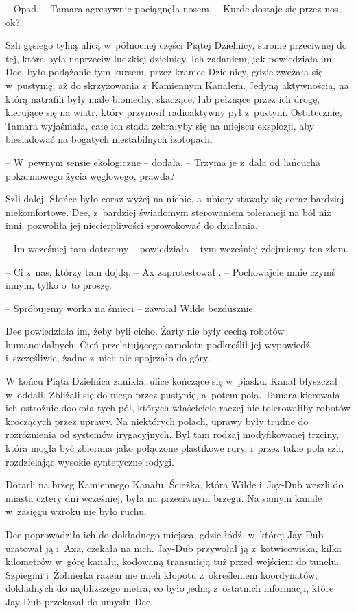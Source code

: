 \documentclass[oneside,polish,11pt,sfheadings]{mwbk}
\begin{document}
-- Opad. -- Tamara agresywnie pociągnęła nosem. -- Kurde dostaje się przez
nos, ok?

Szli gęsiego tylną ulicą w~północnej części Piątej Dzielnicy, stronie
przeciwnej do tej, która była naprzeciw ludzkiej dzielnicy. Ich
zadaniem, jak powiedziała im Dee, było podążanie tym kursem, przez
kraniec Dzielnicy, gdzie zwężała się w~pustynię, aż do skrzyżowania z~Kamiennym Kanałem. Jedyną aktywnością, na którą natrafili były małe
biomechy, skaczące, lub pełznące przez ich drogę, kierujące się na
wiatr, który przynosił radioaktywny pył z~pustyni. Ostatecznie, Tamara
wyjaśniała, całe ich stada zebrałyby się na miejscu eksplozji, aby
biesiadować na bogatych niestabilnych izotopach.

-- W~pewnym sensie ekologiczne -- dodała. -- Trzyma je z~dala od łańcucha
pokarmowego życia węglowego, prawda?

Szli dalej. Słońce było coraz wyżej na niebie, a~ubiory stawały się
coraz bardziej niekomfortowe. Dee, z~bardziej świadomym sterowaniem
tolerancji na ból niż inni, pozwoliła jej niecierpliwości sprowokować do
działania.

-- Im wcześniej tam dotrzemy -- powiedziała -- tym wcześniej zdejmiemy ten
złom.

-- Ci z~nas, którzy tam dojdą. -- Ax zaprotestował . -- Pochowajcie mnie
czymś innym, tylko o~to proszę.

-- Spróbujemy worka na śmieci -- zawołał Wilde bezdusznie.

Dee powiedziała im, żeby byli cicho. Żarty nie były cechą robotów
humanoidalnych. Cień przelatującego samolotu podkreślił jej wypowiedź i~szczęśliwie, żadne z~nich nie spojrzało do góry.

W końcu Piąta Dzielnica zanikła, ulice kończące się w~piasku. Kanał
błyszczał w~oddali. Zbliżali się do niego przez pustynię, a~potem pola.
Tamara kierowała ich ostrożnie dookoła tych pól, których właściciele
raczej nie tolerowaliby robotów kroczących przez uprawy. Na niektórych
polach, uprawy były trudne do rozróżnienia od systemów irygacyjnych. Był
tam rodzaj modyfikowanej trzciny, która mogła być zbierana jako
połączone plastikowe rury, i~przez takie pola szli, rozdzielając wysokie
syntetyczne łodygi.

Dotarli na brzeg Kamiennego Kanału. Ścieżka, którą Wilde i~Jay-Dub
weszli do miasta cztery dni wcześniej, była na przeciwnym brzegu. Na
samym kanale w~zasięgu wzroku nie było ruchu.

Dee poprowadziła ich do dokładnego miejsca, gdzie łódź, w~której Jay-Dub
uratował ją i~Axa, czekała na nich. Jay-Dub przywołał ją z~kotwicowiska,
kilka kilometrów w~górę kanału, kodowaną transmisją tuż przed wejściem
do tunelu. Szpiegini i~Żołnierka razem nie mieli kłopotu z~określeniem
koordynatów, dokładnych do najbliższego metra, co było jedną z~ostatnich
informacji, które Jay-Dub przekazał do umysłu Dee.
\end{document}
